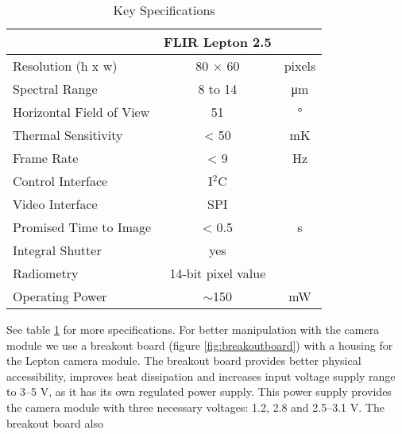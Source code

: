 \begin{table}[htb]
    \centering
    \caption{Key Specifications}
    \label{tab:thcamspecifications}
    \begin{tabular}{l c c}
        \hline
                                                            &   FLIR Lepton 2.5 	&          	\\
        \hline
        \rowcolor{aliceblue!85} Resolution (h x w)	       	&   80 $\times$ 60  	&	pixels	\\
        Spectral Range	                                    	&   8  to 14        	&	\si{\micro\meter}	\\
        \rowcolor{aliceblue!85} Horizontal Field of View		&   51              	&   \si{\degree}			\\
        Thermal Sensitivity	                                	&   < 50            	&   \si{\milli\kelvin}	\\
        \rowcolor{aliceblue!85} Frame Rate	                	&   < 9             	&   \si{\hertz} 			\\
        Control Interface	                                	&   I$^{2}$C        	&               			\\
        \rowcolor{aliceblue!85} Video Interface	            	&   SPI             	&               			\\
        Promised Time to Image	                            	&   < 0.5           	&   \si{\second}    		\\
        \rowcolor{aliceblue!85} Integral Shutter		    		&   yes             	&   			\\
        Radiometry	                                        	&   14-bit pixel value  	&       \\
        \rowcolor{aliceblue!85} Operating Power             	&	$\sim$150       	&   \si{\milli\watt} 	\\
        \hline
\end{tabular}
\end{table}
%
\linebreak See table \ref{tab:thcamspecifications} for more specifications. For
better manipulation with the camera module we use a breakout board (figure
\ref{fig:breakoutboard}) with a housing for the Lepton camera module. The
breakout board provides better physical accessibility, improves heat dissipation
and increases input voltage supply range to 3--5 \si{\volt}, as it has its own
regulated power supply. This power supply provides the camera module with three
necessary voltages: 1.2, 2.8 and 2.5--3.1 \si{\volt}. The breakout board also
